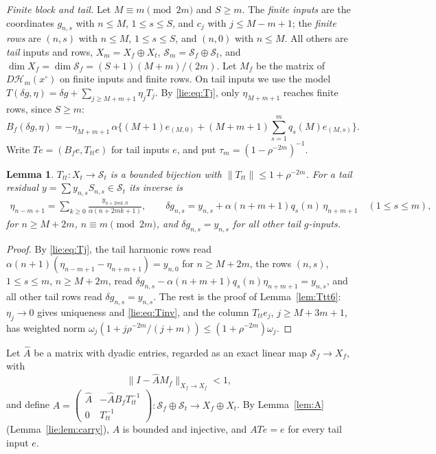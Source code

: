 \documentclass[11pt]{amsart}
\newtheorem{lemma}[theorem]{Lemma}
\theoremstyle{definition}
\theoremstyle{remark}
\numberwithin{equation}{section}
\newcommand{\Sc}{\mathcal{S}}
\newcommand{\nrm}[1]{\lVert #1\rVert}
\newcommand{\Hc}{\mathcal{H}}
\begin{document}
\emph{Finite block and tail.} Let $M\equiv m\pmod{2m}$ and $S\geq m$. The \emph{finite inputs} are the coordinates $g_{n,s}$ with $n\leq M$, $1\leq s\leq S$, and $c_j$ with $j\leq M-m+1$; the \emph{finite rows} are $(n,s)$ with $n\leq M$, $1\leq s\leq S$, and $(n,0)$ with $n\leq M$. All others are \emph{tail} inputs and rows, $X_m=X_f\oplus X_t$, $\Sc_m=\Sc_f\oplus\Sc_t$, and $\dim X_f=\dim\Sc_f=(S+1)(M+m)/(2m)$. Let $M_f$ be the matrix of $D\Hc_m(x^\circ)$ on finite inputs and finite rows. On tail inputs we use the model $T(\delta g,\eta)=\delta g+\sum_{j\geq M+m+1}\eta_jT_j$. By \eqref{lie:eq:Tj}, only $\eta_{M+m+1}$ reaches finite rows, since $S\geq m$:
\begin{equation}\label{lie:eq:B}
B_f(\delta g,\eta)=-\eta_{M+m+1}\,\alpha\Big\{(M+1)e_{(M,0)}+(M+m+1)\sum_{s=1}^mq_s(M)e_{(M,s)}\Big\}.
\end{equation}
Write $Te=(B_fe,T_{tt}e)$ for tail inputs $e$, and put $\tau_m=(1-\rho^{-2m})^{-1}$.

\begin{lemma}\label{lie:lem:Ttt}
$T_{tt}\colon X_t\to\Sc_t$ is a bounded bijection with $\nrm{T_{tt}}\leq1+\rho^{-2m}$. For a tail residual $y=\sum y_{n,s}S_{n,s}\in\Sc_t$ its inverse is
\begin{gather}
\eta_{n-m+1}=\sum_{k\geq0}\frac{y_{n+2mk,0}}{\alpha(n+2mk+1)},\qquad\delta g_{n,s}=y_{n,s}+\alpha(n+m+1)q_s(n)\,\eta_{n+m+1}\quad(1\leq s\leq m),\label{lie:eq:Tinv}
\end{gather}
for $n\geq M+2m$, $n\equiv m\pmod{2m}$, and $\delta g_{n,s}=y_{n,s}$ for all other tail $g$-inputs.
\end{lemma}

\begin{proof}
By \eqref{lie:eq:Tj}, the tail harmonic rows read $\alpha(n+1)(\eta_{n-m+1}-\eta_{n+m+1})=y_{n,0}$ for $n\geq M+2m$, the rows $(n,s)$, $1\leq s\leq m$, $n\geq M+2m$, read $\delta g_{n,s}-\alpha(n+m+1)q_s(n)\eta_{n+m+1}=y_{n,s}$, and all other tail rows read $\delta g_{n,s}=y_{n,s}$. The rest is the proof of Lemma~\ref{lem:Ttt6}: $\eta_j\to0$ gives uniqueness and \eqref{lie:eq:Tinv}, and the column $T_{tt}e_j$, $j\geq M+3m+1$, has weighted norm $\omega_j(1+j\rho^{-2m}/(j+m))\leq(1+\rho^{-2m})\omega_j$.
\end{proof}

Let $\widehat A$ be a matrix with dyadic entries, regarded as an exact linear map $\Sc_f\to X_f$, with
\begin{equation}\label{lie:eq:Ahat}
\nrm{I-\widehat AM_f}_{X_f\to X_f}<1,
\end{equation}
and define $A=\left(\begin{smallmatrix}\widehat A&-\widehat AB_fT_{tt}^{-1}\\0&T_{tt}^{-1}\end{smallmatrix}\right)\colon\Sc_f\oplus\Sc_t\to X_f\oplus X_t$. By Lemma~\ref{lem:A} (Lemma~\ref{lie:lem:carry}), $A$ is bounded and injective, and $ATe=e$ for every tail input $e$.
\end{document}
